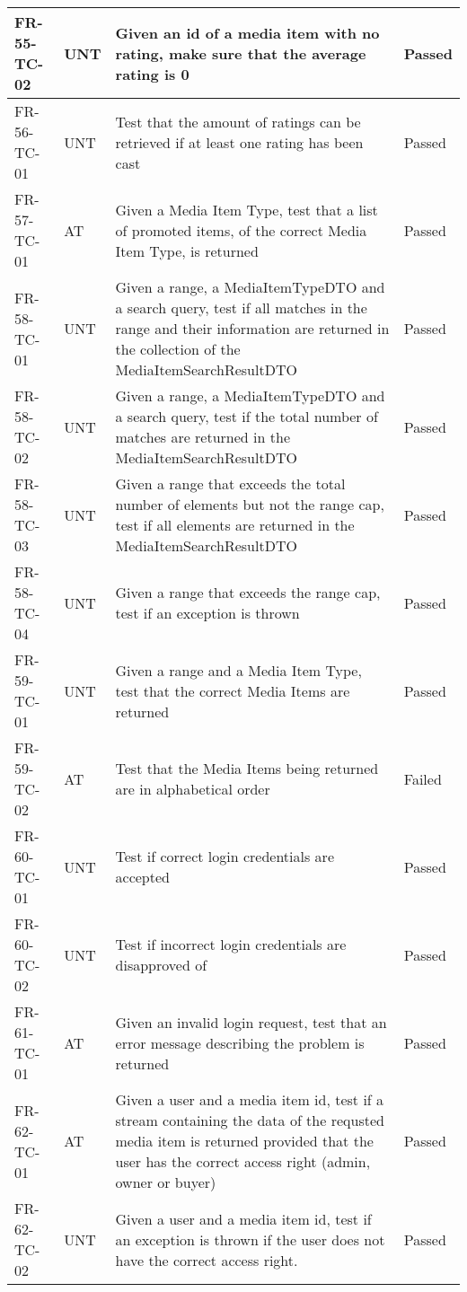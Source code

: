 \documentclass[../report.tex]{subfiles}
\begin{document}
\begin{longtable}{|L{2.1cm}|L{1cm}|L{12.4cm}|L{1.4cm}|}
FR-55-TC-02&UNT&Given an id of a media item with no rating, make sure that the average rating is 0&Passed  \\ \hline
FR-56-TC-01&UNT&Test that the amount of ratings can be retrieved if at least one rating has been cast&Passed  \\ \hline
FR-57-TC-01&AT&Given a Media Item Type, test that a list of promoted items, of the correct Media Item Type, is returned&Passed  \\ \hline
FR-58-TC-01&UNT&Given a range, a MediaItemTypeDTO and a search query, test if all matches in the range and their information are returned in the collection of the MediaItemSearchResultDTO&Passed  \\ \hline
FR-58-TC-02&UNT&Given a range, a MediaItemTypeDTO and a search query, test if the total number of matches are returned in the MediaItemSearchResultDTO&Passed  \\ \hline
FR-58-TC-03&UNT&Given a range that exceeds the total number of elements but not the range cap, test if all elements are returned in the MediaItemSearchResultDTO&Passed  \\ \hline
FR-58-TC-04&UNT&Given a range that exceeds the range cap, test if an exception is thrown&Passed  \\ \hline
FR-59-TC-01&UNT&Given a range and a Media Item Type,  test that the correct Media Items are returned&Passed  \\ \hline
FR-59-TC-02&AT&Test that the Media Items being returned are in alphabetical order&Failed  \\ \hline
FR-60-TC-01&UNT&Test if correct login credentials are accepted&Passed  \\ \hline
FR-60-TC-02&UNT&Test if incorrect login credentials are disapproved of&Passed  \\ \hline
FR-61-TC-01&AT&Given an invalid login request, test that an error message describing the problem is returned&Passed  \\ \hline
FR-62-TC-01&AT&Given a user and a media item id, test if a stream containing the data of the requsted media item is returned provided that the user has the correct access right (admin, owner or buyer)&Passed  \\ \hline
FR-62-TC-02&UNT&Given a user and a media item id, test if an exception is thrown if the user does not have the correct access right.&Passed  \\ \hline

\end{longtable}
\end{document}
